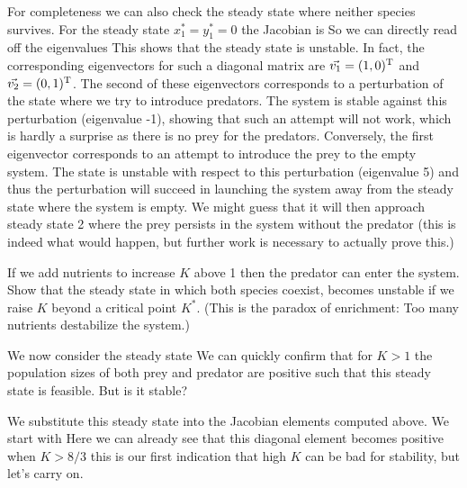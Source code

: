 For completeness we can also check the steady state where neither species survives. For the steady state $x_1^*=y_1^*=0$ the Jacobian is    
So we can directly read off the eigenvalues 
This shows that the steady state is unstable. In fact, the corresponding eigenvectors for such a diagonal matrix are $\vec{v_1}=(1,0)^{\rm T}$ and $\vec{v_2}=(0,1)^{\rm T}$. The second of these eigenvectors corresponds to a perturbation of the state where we try to introduce predators. The system is stable against this perturbation (eigenvalue -1), showing that such an attempt will not work, which is hardly a surprise as there is no prey for the predators. Conversely, the first eigenvector corresponds to an attempt to introduce the prey to the empty system. The state is unstable with respect to this perturbation (eigenvalue 5) and thus the perturbation will succeed in launching the system away from the steady state where the system is empty. We might guess that it will then approach steady state 2 where the prey persists in the system without the predator (this is indeed what would happen, but further work is necessary to actually prove this.)

\subquestion
If we add nutrients to increase $K$ above 1 then the predator can enter the system. Show that the steady state in which both species coexist, becomes unstable if we raise $K$ beyond a critical point $K^*$. (This is the paradox of enrichment: Too many nutrients destabilize the system.) 

\solution 
We now consider the steady state 
We can quickly confirm that for $K>1$ the population sizes of both prey and predator are positive such that this steady state is feasible. 
But is it stable?

We substitute this steady state into the Jacobian elements computed above. We start with 
Here we can already see that this diagonal element becomes positive when 
$K>8/3$ this is our first indication that high $K$ can be bad for stability, but let's carry on. 

